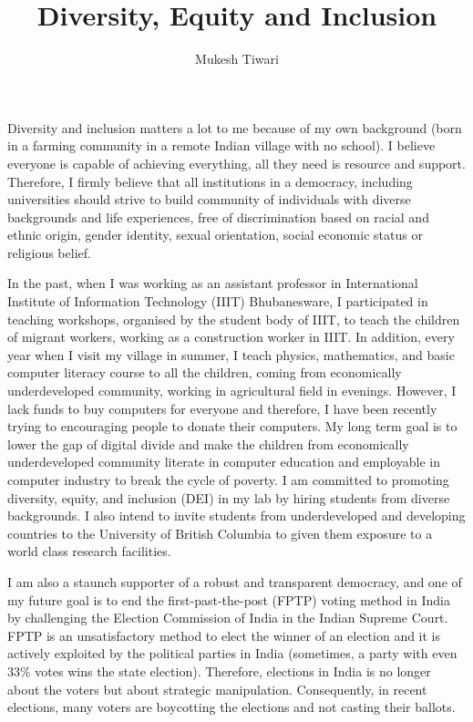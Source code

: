 \documentclass[a4paper]{article}
\title{Diversity, Equity and Inclusion}
\author{Mukesh Tiwari}
\date{}
\begin{document}
\fontsize{12}{15}
\selectfont
\maketitle

Diversity and inclusion matters a lot to me because of my own background (born in 
a farming community in a remote Indian village with no school). I believe everyone is capable of 
achieving everything, all they need is resource and support. Therefore,  I firmly believe that 
all institutions in a democracy, including universities should strive to build
community of individuals with diverse backgrounds and life experiences, 
free of discrimination based on racial and ethnic origin, gender identity, 
sexual orientation, social economic status or religious belief. 

\vspace{0.5cm}
In the past, when I was working as an assistant professor in International Institute of 
Information Technology (IIIT) Bhubanesware, I participated in teaching 
workshops, organised by the student body of IIIT, to teach the 
children of migrant workers, working as a construction worker in IIIT.
In addition, every year when I visit my village 
in summer, I teach physics, mathematics, and basic computer literacy course to 
all the children, coming from 
economically underdeveloped community, working in 
agricultural field in evenings. However, I lack funds to buy computers for everyone 
and therefore, I have been recently trying to encouraging people to donate 
their computers. My long term goal is to lower the gap of digital divide and make the 
children from economically underdeveloped community literate in computer education 
and employable in computer industry to break the cycle of poverty. 
I am committed to promoting diversity, equity, and inclusion (DEI) in my lab by 
hiring students from diverse backgrounds. I also intend to invite 
students from underdeveloped and developing countries to the University of 
British Columbia to given them exposure to a world class research facilities. 



\vspace{0.5cm}
I am also a staunch supporter of a robust and transparent 
democracy, and one of my future goal is to end the 
first-past-the-post (FPTP) voting method in India by challenging the Election 
Commission of India in the Indian Supreme Court. FPTP is an unsatisfactory method 
to elect the winner of an election and it is actively exploited by 
the political parties in India (sometimes, a party with even 33\% votes 
wins the state election). Therefore, elections in India is no longer 
about the voters but about strategic manipulation. Consequently, 
in recent elections, many voters are boycotting the elections and 
not casting their ballots. 
\end{document}

